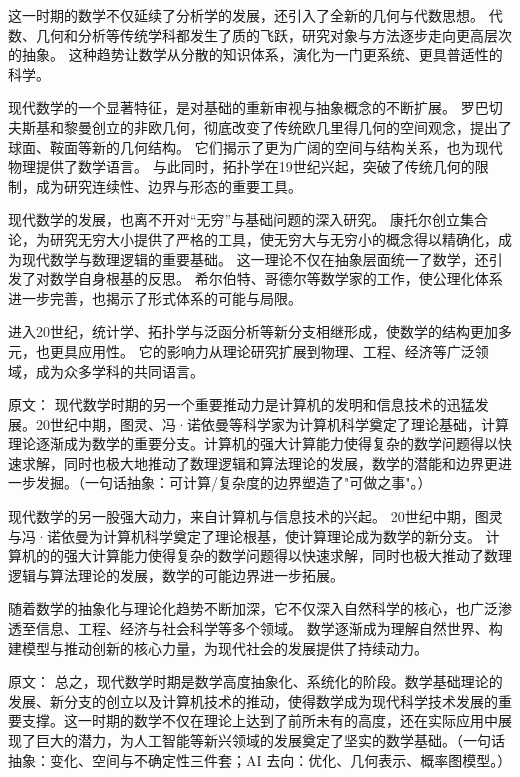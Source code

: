 这一时期的数学不仅延续了分析学的发展，还引入了全新的几何与代数思想。  
代数、几何和分析等传统学科都发生了质的飞跃，研究对象与方法逐步走向更高层次的抽象。  
这种趋势让数学从分散的知识体系，演化为一门更系统、更具普适性的科学。


现代数学的一个显著特征，是对基础的重新审视与抽象概念的不断扩展。  
罗巴切夫斯基和黎曼创立的非欧几何，彻底改变了传统欧几里得几何的空间观念，提出了球面、鞍面等新的几何结构。  
它们揭示了更为广阔的空间与结构关系，也为现代物理提供了数学语言。  
与此同时，拓扑学在19世纪兴起，突破了传统几何的限制，成为研究连续性、边界与形态的重要工具。




现代数学的发展，也离不开对“无穷”与基础问题的深入研究。  
康托尔创立集合论，为研究无穷大小提供了严格的工具，使无穷大与无穷小的概念得以精确化，成为现代数学与数理逻辑的重要基础。  
这一理论不仅在抽象层面统一了数学，还引发了对数学自身根基的反思。  
希尔伯特、哥德尔等数学家的工作，使公理化体系进一步完善，也揭示了形式体系的可能与局限。




进入20世纪，统计学、拓扑学与泛函分析等新分支相继形成，使数学的结构更加多元，也更具应用性。  
它的影响力从理论研究扩展到物理、工程、经济等广泛领域，成为众多学科的共同语言。  


原文：
现代数学时期的另一个重要推动力是计算机的发明和信息技术的迅猛发展。20世纪中期，图灵、冯·诺依曼等科学家为计算机科学奠定了理论基础，计算理论逐渐成为数学的重要分支。计算机的强大计算能力使得复杂的数学问题得以快速求解，同时也极大地推动了数理逻辑和算法理论的发展，数学的潜能和边界更进一步发掘。{（一句话抽象：可计算/复杂度的边界塑造了"可做之事"。）}




现代数学的另一股强大动力，来自计算机与信息技术的兴起。  
20世纪中期，图灵与冯·诺依曼为计算机科学奠定了理论根基，使计算理论成为数学的新分支。  
计算机的的强大计算能力使得复杂的数学问题得以快速求解，同时也极大推动了数理逻辑与算法理论的发展，数学的可能边界进一步拓展。  





随着数学的抽象化与理论化趋势不断加深，它不仅深入自然科学的核心，也广泛渗透至信息、工程、经济与社会科学等多个领域。  
数学逐渐成为理解自然世界、构建模型与推动创新的核心力量，为现代社会的发展提供了持续动力。

原文：
总之，现代数学时期是数学高度抽象化、系统化的阶段。数学基础理论的发展、新分支的创立以及计算机技术的推动，使得数学成为现代科学技术发展的重要支撑。这一时期的数学不仅在理论上达到了前所未有的高度，还在实际应用中展现了巨大的潜力，为人工智能等新兴领域的发展奠定了坚实的数学基础。{（一句话抽象：变化、空间与不确定性三件套；AI 去向：优化、几何表示、概率图模型。）}




